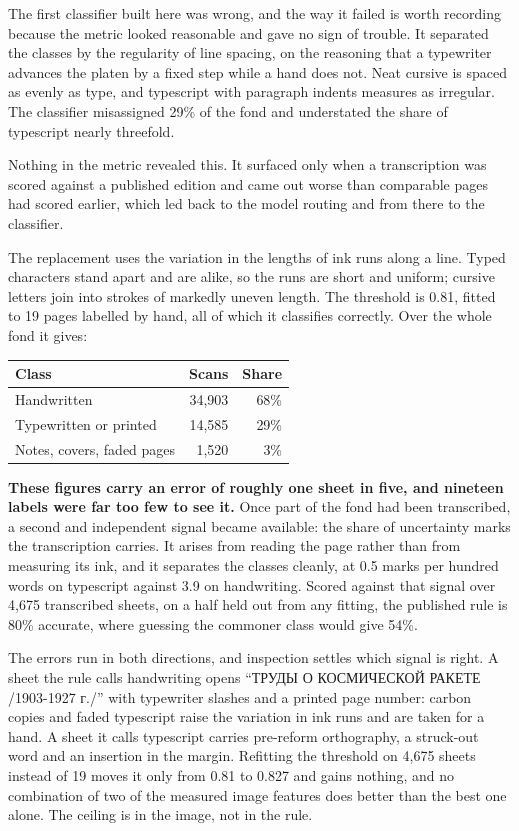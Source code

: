 \documentclass[11pt,a4paper]{article}
\begin{document}
The first classifier built here was wrong, and the way it failed is worth
recording because the metric looked reasonable and gave no sign of trouble. It
separated the classes by the regularity of line spacing, on the reasoning that
a typewriter advances the platen by a fixed step while a hand does not. Neat
cursive is spaced as evenly as type, and typescript with paragraph indents
measures as irregular. The classifier misassigned 29\% of the fond and
understated the share of typescript nearly threefold.

Nothing in the metric revealed this. It surfaced only when a transcription was
scored against a published edition and came out worse than comparable pages
had scored earlier, which led back to the model routing and from there to the
classifier.

The replacement uses the variation in the lengths of ink runs along a line.
Typed characters stand apart and are alike, so the runs are short and uniform;
cursive letters join into strokes of markedly uneven length. The threshold is
0.81, fitted to 19 pages labelled by hand, all of which it classifies
correctly. Over the whole fond it gives:

\begin{longtable}[]{@{}lrr@{}}
\toprule\noalign{}
Class & Scans & Share \\
\midrule\noalign{}
\endhead
\bottomrule\noalign{}
\endlastfoot
Handwritten & 34,903 & 68\% \\
Typewritten or printed & 14,585 & 29\% \\
Notes, covers, faded pages & 1,520 & 3\% \\
\end{longtable}

\textbf{These figures carry an error of roughly one sheet in five, and nineteen
labels were far too few to see it.} Once part of the fond had been
transcribed, a second and independent signal became available: the share of
uncertainty marks the transcription carries. It arises from reading the page
rather than from measuring its ink, and it separates the classes cleanly, at
0.5 marks per hundred words on typescript against 3.9 on handwriting. Scored
against that signal over 4,675 transcribed sheets, on a half held out from any
fitting, the published rule is 80\% accurate, where guessing the commoner class
would give 54\%.

The errors run in both directions, and inspection settles which signal is
right. A sheet the rule calls handwriting opens ``ТРУДЫ О КОСМИЧЕСКОЙ РАКЕТЕ
/1903-1927 г./'' with typewriter slashes and a printed page number: carbon
copies and faded typescript raise the variation in ink runs and are taken for
a hand. A sheet it calls typescript carries pre-reform orthography, a
struck-out word and an insertion in the margin. Refitting the threshold on
4,675 sheets instead of 19 moves it only from 0.81 to 0.827 and gains nothing,
and no combination of two of the measured image features does better than the
best one alone. The ceiling is in the image, not in the rule.
\end{document}
